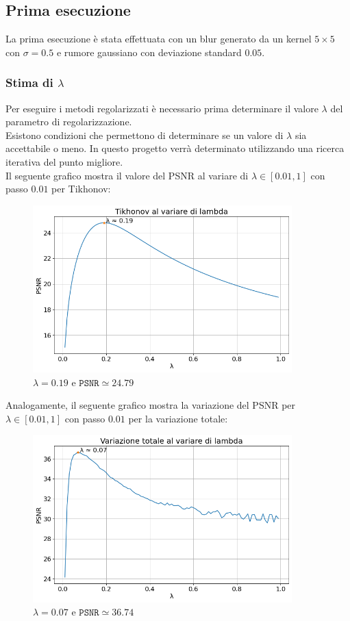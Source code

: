 \documentclass[11pt]{article}
\begin{document}
\subsection{Prima esecuzione}
La prima esecuzione è stata effettuata con un blur generato da un kernel $5 \times 5$ con $\sigma=0.5$ e rumore gaussiano con deviazione standard $0.05$.

\subsubsection{Stima di $\lambda$}
Per eseguire i metodi regolarizzati è necessario prima determinare il valore $\lambda$ del parametro di regolarizzazione.\\
Esistono condizioni che permettono di determinare se un valore di $\lambda$ sia accettabile o meno. In questo progetto verrà determinato utilizzando una ricerca iterativa del punto migliore.\\
Il seguente grafico mostra il valore del PSNR al variare di $\lambda \in [0.01, 1]$ con passo $0.01$ per Tikhonov:
\begin{figure}[H]
    \centering
    \includegraphics[width=10cm]{esecuzione/1/tikhonov_lambda.png}
    \caption{$\lambda=0.19$ e $\texttt{PSNR} \simeq 24.79$}
    \label{fig:tikhonov_lambda1}
\end{figure}
Analogamente, il seguente grafico mostra la variazione del PSNR per $\lambda \in [0.01, 1]$ con passo $0.01$ per la variazione totale:
\begin{figure}[H]
    \centering
    \includegraphics[width=10cm]{esecuzione/1/tv_lambda.png}
    \caption{$\lambda=0.07$ e $\texttt{PSNR} \simeq 36.74$}
    \label{fig:tv_lambda1}
\end{figure}
\end{document}
